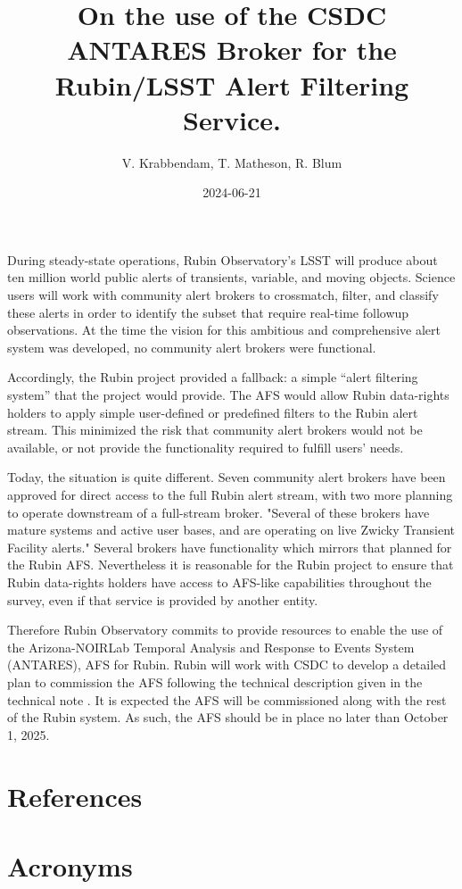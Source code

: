 \documentclass[DM,authoryear]{lsstdoc}
\title{On the use of the CSDC ANTARES Broker for the Rubin/LSST Alert Filtering Service.}
\author{V. Krabbendam, T. Matheson, R. Blum}
\date{2024-06-21}
\begin{document}
        
\mkmemotitle

During steady-state operations, Rubin Observatory's LSST will produce about ten million world public alerts of transients, variable, and moving objects. Science users will work with community alert
brokers to crossmatch, filter, and classify these alerts in order to identify the subset that require real-time followup observations. 
At the time the vision for this ambitious and comprehensive alert system was developed, no community alert brokers were functional.

Accordingly, the Rubin project provided a fallback: a simple “alert filtering system” that the project would provide. 
The AFS would allow Rubin data-rights holders to apply simple user-defined or predefined filters to the Rubin alert stream. 
This minimized the risk that community alert brokers would not be available, or not provide the functionality required to fulfill users' needs.

Today, the situation is quite different. 
Seven community alert brokers have been approved for direct access to the full Rubin alert stream, with two more planning to operate downstream of a full-stream broker. 
 "Several of these brokers have mature systems and active user bases, and are operating on live Zwicky Transient Facility alerts."
Several brokers have functionality which mirrors that planned for the Rubin AFS. 
Nevertheless it is reasonable for the Rubin project to ensure that Rubin data-rights holders have access to AFS-like capabilities throughout the survey, even if that service is provided by another entity.

Therefore Rubin Observatory commits to provide resources to enable the use of the Arizona-NOIRLab Temporal Analysis and Response to Events System (ANTARES),   \citep{2021AJ....161..107M} AFS for Rubin. 
Rubin will work with CSDC to develop a detailed plan to commission the AFS following the technical description given in the  technical note . 
It is expected the AFS will be commissioned along with the rest of the Rubin system. 
As such, the AFS should be in place no later than October 1, 2025.

\clearpage
\appendix
\section{References} \label{sec:bib}
\renewcommand{\refname}{} %


\section{Acronyms} \label{sec:acronyms}

\end{document}
